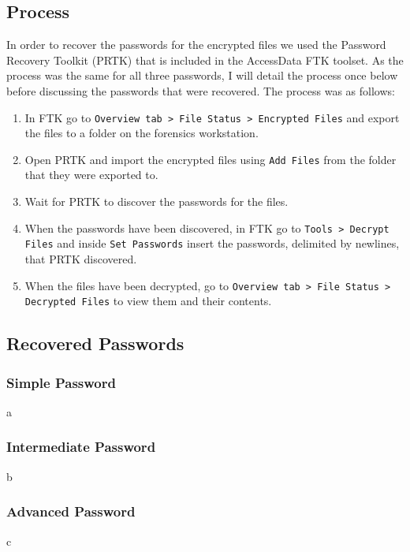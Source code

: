 \subsection{Process}
In order to recover the passwords for the encrypted files we used the Password Recovery Toolkit (PRTK) that is included in the AccessData FTK toolset. As the process was the same for all three passwords, I will detail the process once below before discussing the passwords that were recovered. The process was as follows:
\begin{enumerate}
  \item In FTK go to \texttt{Overview tab > File Status > Encrypted Files} and export the files to a folder on the forensics workstation.
  \item Open PRTK and import the encrypted files using \texttt{Add Files} from the folder that they were exported to.
  \item Wait for PRTK to discover the passwords for the files.
  \item When the passwords have been discovered, in FTK go to \texttt{Tools > Decrypt Files} and inside \texttt{Set Passwords} insert the passwords, delimited by newlines, that PRTK discovered.
  \item When the files have been decrypted, go to \texttt{Overview tab > File Status > Decrypted Files} to view them and their contents.
\end{enumerate}

\subsection{Recovered Passwords}
\subsubsection{Simple Password}
a
\subsubsection{Intermediate Password}
b
\subsubsection{Advanced Password}
c

